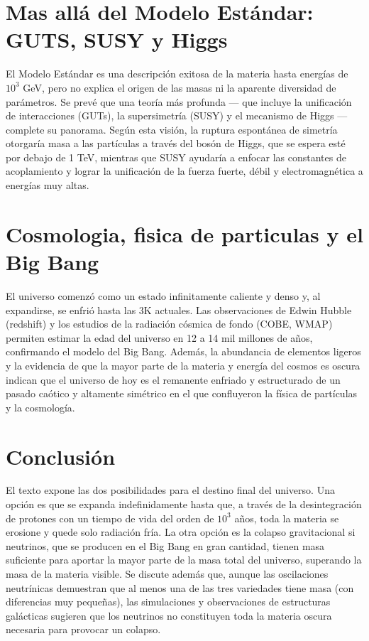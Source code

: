 \documentclass[12pt]{article}
\begin{document}
\section{Mas allá del Modelo Estándar: GUTS, SUSY y Higgs}
El Modelo Estándar es una descripción exitosa de la materia hasta energías de $10^{3}$ GeV, pero no explica el origen de las masas ni la aparente diversidad de parámetros. Se prevé que una teoría más profunda — que incluye la unificación de interacciones (GUTs), la supersimetría (SUSY) y el mecanismo de Higgs — complete su panorama. Según esta visión, la ruptura espontánea de simetría otorgaría masa a las partículas a través del bosón de Higgs, que se espera esté por debajo de 1 TeV, mientras que SUSY ayudaría a enfocar las constantes de acoplamiento y lograr la unificación de la fuerza fuerte, débil y electromagnética a energías muy altas.

\section{Cosmologia, fisica de particulas y el Big Bang}
El universo comenzó como un estado infinitamente caliente y denso y, al expandirse, se enfrió hasta las 3K actuales. Las observaciones de Edwin Hubble (redshift) y los estudios de la radiación cósmica de fondo (COBE, WMAP) permiten estimar la edad del universo en 12 a 14 mil millones de años, confirmando el modelo del Big Bang. Además, la abundancia de elementos ligeros y la evidencia de que la mayor parte de la materia y energía del cosmos es oscura indican que el universo de hoy es el remanente enfriado y estructurado de un pasado caótico y altamente simétrico en el que confluyeron la física de partículas y la cosmología.

\section{Conclusión}
El texto expone las dos posibilidades para el destino final del universo. Una opción es que se expanda indefinidamente hasta que, a través de la desintegración de protones con un tiempo de vida del orden de $10^{3}$ años, toda la materia se erosione y quede solo radiación fría. La otra opción es la colapso gravitacional si neutrinos, que se producen en el Big Bang en gran cantidad, tienen masa suficiente para aportar la mayor parte de la masa total del universo, superando la masa de la materia visible. Se discute además que, aunque las oscilaciones neutrínicas demuestran que al menos una de las tres variedades tiene masa (con diferencias muy pequeñas), las simulaciones y observaciones de estructuras galácticas sugieren que los neutrinos no constituyen toda la materia oscura necesaria para provocar un colapso.
\end{document}
